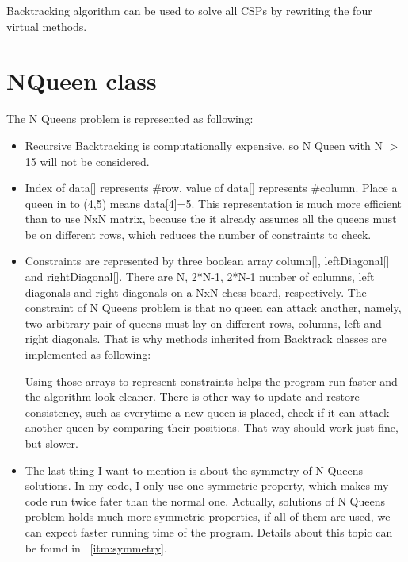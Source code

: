 \documentclass[a4paper, 11pt]{article}
\begin{document}
Backtracking algorithm can be used to solve all CSPs by rewriting the four virtual methods.

\newpage
\section{NQueen class}
The N Queens problem is represented as following: 


\begin{itemize}
\item Recursive Backtracking is computationally expensive, so N Queen with N $>$ 15 will not be considered. 
\item Index of data[] represents \#row, value of data[] represents \#column. Place a queen in to (4,5) means data[4]=5. This representation is much more efficient than to use NxN matrix, because the it already assumes all the queens must be on different rows, which reduces the number of constraints to check.
\item Constraints are represented by three boolean array column[], leftDiagonal[] and rightDiagonal[]. There are N, 2*N-1, 2*N-1 number of columns, left diagonals and right diagonals on a NxN chess board, respectively. The constraint of N Queens problem is that no queen can attack another, namely, two arbitrary pair of queens must lay on different rows, columns, left and right diagonals. That is why methods inherited from Backtrack classes are implemented as following:

  Using those arrays to represent constraints helps the program run faster and the algorithm look cleaner. There is other way to update and restore consistency, such as everytime a new queen is placed, check if it can attack another queen by comparing their positions. That way should work just fine, but slower.

\item The last thing I want to mention is about the symmetry of N Queens solutions. In my code, I only use one symmetric property, which makes my code run twice fater than the normal one. Actually, solutions of N Queens problem holds much more symmetric properties, if all of them are used, we can expect faster running time of the program. Details about this topic can be found in ~\ref{itm:symmetry}.
\end{itemize}
\end{document}
